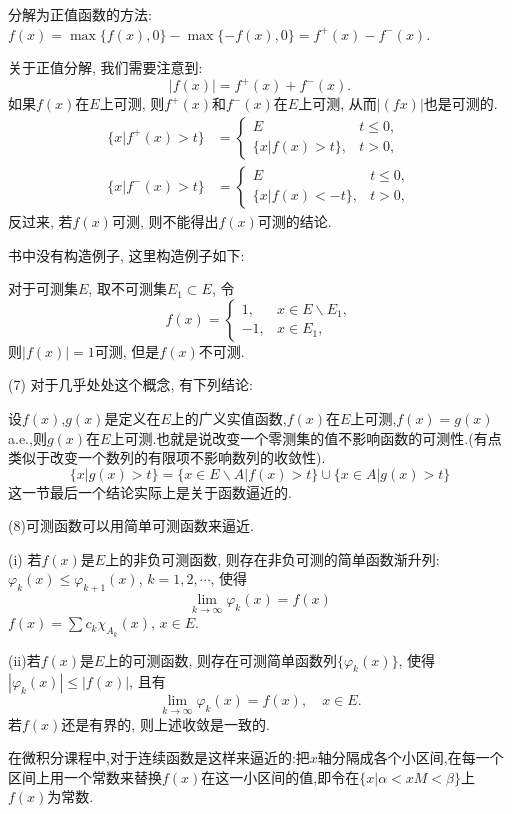\documentclass[12pt,a4paper,openany]{book}
\begin{document}
分解为正值函数的方法: $f(x) = \max\{f(x), 0\} - \max\{-f(x), 0\} = f^+(x) - f^-(x)$.

关于正值分解, 我们需要注意到:
\[
|f(x)| = f^+(x) + f^-(x).
\]
如果$f(x)$在$E$上可测, 则$f^+(x)$和$f^-(x)$在$E$上可测, 从而$|(fx)|$也是可测的.
\[
\begin{aligned}
\{x | f^+(x) > t\} &= 
\begin{cases}
E &t \le 0,\\
\{x | f(x) > t\}, &t > 0,
\end{cases}
\\
\{x | f^-(x) > t\} &=
\begin{cases}
E &t \le 0,\\
\{x | f(x) < -t\}, &t > 0,
\end{cases}
\end{aligned}
\]
反过来, 若$f(x)$可测, 则不能得出$f(x)$可测的结论.

书中没有构造例子, 这里构造例子如下:

对于可测集$E$, 取不可测集$E_1 \subset E$, 令
\[
f(x) = 
\begin{cases}
1, & x \in E \backslash E_1, \\
-1, & x\in E_1,
\end{cases}
\]
则$|f(x)| = 1$可测, 但是$f(x)$不可测.

(7) 对于几乎处处这个概念, 有下列结论:

设$f(x)$,$g(x)$是定义在$E$上的广义实值函数,$f(x)$在$E$上可测,$f(x)=g(x)$ a.e.,则$g(x)$在$E$上可测.也就是说改变一个零测集的值不影响函数的可测性.(有点类似于改变一个数列的有限项不影响数列的收敛性).
\[
\{x | g(x) > t\} = \{x \in E\backslash A | f(x) > t\} \cup \{x \in A | g(x) > t\}
\]
这一节最后一个结论实际上是关于函数逼近的.

(8)可测函数可以用简单可测函数来逼近.

(i) 若$f(x)$是$E$上的非负可测函数, 则存在非负可测的简单函数渐升列: $\varphi_k(x) \le \varphi_{k+1}(x)$, $k=1,2,\cdots$, 使得
\[
\lim_{k \rightarrow \infty}{
\varphi_k(x)} = f(x)
\]
$f(x) = \sum{c_k\chi_{A_k}(x)}$, $x \in E$.

(ii)若$f(x)$是$E$上的可测函数, 则存在可测简单函数列$\{\varphi_k(x)\}$, 使得$|\varphi_k(x)| \le |f(x)|$, 且有
\[
\lim_{k \rightarrow \infty}{\varphi_k(x)} = f(x), \quad x \in E.
\]
若$f(x)$还是有界的, 则上述收敛是一致的.

在微积分课程中,对于连续函数是这样来逼近的:把$x$轴分隔成各个小区间,在每一个区间上用一个常数来替换$f(x)$在这一小区间的值,即令在$\{x| \alpha < x M< \beta\}$上$f(x)$为常数.
\end{document}
